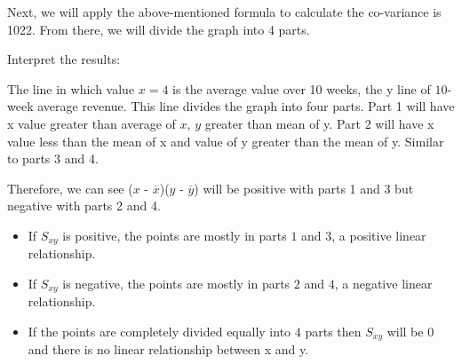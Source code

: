 \documentclass{article}
\begin{document}
    Next, we will apply the above-mentioned formula to calculate the co-variance is 1022. From there, we will divide the graph into 4 parts.
    
    \begin{center}
    \end{center}
    
    Interpret the results: 
    
    The line in which value ${x = 4}$ is the average value over 10 weeks, the y line of ${10}$-week average revenue. This line divides the graph into four parts. Part 1 will have x value greater than average of ${x}$, ${y}$ greater than mean of y. Part 2 will have x value less than the mean of x and value of y greater than the mean of y. Similar to parts 3 and 4.
    
    Therefore, we can see (${x}$ - ${\overline{x}}$)(${y}$ - ${\overline{y}}$) will be positive with parts 1 and 3 but negative with parts 2 and 4. 
    
    \begin{itemize}
        \item If ${S_{xy}}$ is positive, the points are mostly in parts $1$ and $3$, a positive linear relationship. 
        \item If ${S_{xy}}$ is negative, the points are mostly in parts $2$ and $4$, a negative linear relationship. 
        \item If the points are completely divided equally into ${4}$ parts then ${S_{xy}}$ will be $0$ and there is no linear relationship between x and y. 
    \end{itemize}
    
\end{document}
